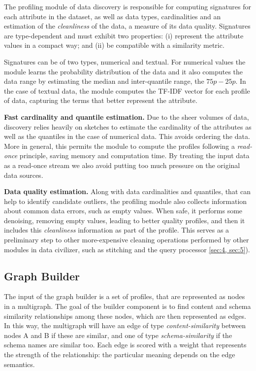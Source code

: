 The profiling module of data discovery is responsible for computing signatures
for each attribute in the dataset, as well as data types, cardinalities and an
estimation of the \emph{cleanliness} of the data, \ie a measure of its data
quality. Signatures are type-dependent and must exhibit two properties: (i)
represent the attribute values in a compact way; and (ii) be compatible with a
similarity metric. 

Signatures can be of two types, numerical and textual. For numerical values the
module learns the probability distribution of the data and it also computes the
data range by estimating the median and inter-quantile range, \ie the $75p -
25p$. In the case of textual data, the module computes the TF-IDF vector for
each profile of data, capturing the terms that better represent the attribute.

\textbf{Fast cardinality and quantile estimation.} Due to the sheer volumes of
data, discovery relies heavily on sketches to estimate the cardinality of the
attributes as well as the quantiles in the case of numerical data. This avoids
ordering the data. More in general, this permits the module to compute the
profiles following a \emph{read-once} principle, saving memory and computation
time. By treating the input data as a read-once stream we also avoid putting too
much pressure on the original data sources.

\textbf{Data quality estimation.} Along with data cardinalities and quantiles,
that can help to identify candidate outliers, the profiling module also collects
information about common data errors, such as empty values. When safe, it
performs some denoising, \ie removing empty values, leading to better quality profiles, and then it
includes this \emph{cleanliness} information as part of the profile. This serves
as a preliminary step to other more-expensive cleaning operations performed by
other modules in data civilizer, such as stitching and the query processor \ref{sec:4,
sec:5}). 

\subsection{Graph Builder} The input of the graph builder is a set of profiles,
that are represented as nodes in a multigraph. The goal of the builder component
is to find content and schema similarity relationships among these nodes, which
are then represented as edges. In this way, the multigraph will have an edge of
type \emph{content-similarity} between nodes A and B if these are similar, and
one of type \emph{schema-similarity} if the schema names are similar too. Each
edge is scored with a weight that represents the strength of the relationship:
the particular meaning depends on the edge semantics.

